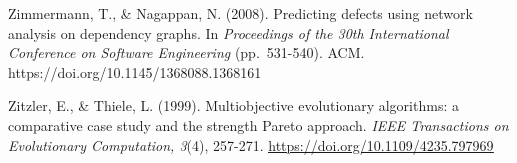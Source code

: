 \documentclass[
  a4paper,
]{article}
\begin{document}
Zimmermann, T., \& Nagappan, N. (2008). Predicting defects using network analysis on dependency graphs. In \emph{Proceedings of the 30th International Conference on Software Engineering} (pp.~531-540). ACM. https://doi.org/10.1145/1368088.1368161

Zitzler, E., \& Thiele, L. (1999). Multiobjective evolutionary algorithms: a comparative case study and the strength Pareto approach. \emph{IEEE Transactions on Evolutionary Computation, 3}(4), 257-271. \href{https://doi.org/10.1109/4235.797969}{\ul{https://doi.org/10.1109/4235.797969}}
\end{document}
